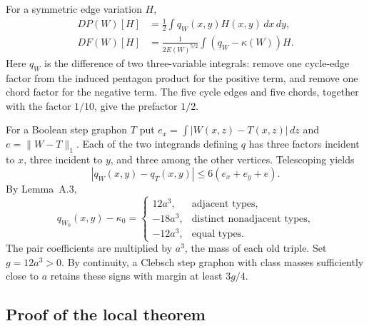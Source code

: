 \documentclass[11pt]{amsart}
\theoremstyle{definition}
\theoremstyle{remark}
\begin{document}
For a symmetric edge variation $H$,
\begin{equation}\tag{86}\label{eq:edge-variation}
 \begin{aligned}
 DP(W)[H]&=\frac12\int q_W(x,y)H(x,y)\,dx\,dy,\\
 DF(W)[H]&=\frac1{2E(W)^{5/2}}\int(q_W-\kappa(W))H.
 \end{aligned}
\end{equation}
Here $q_W$ is the difference of two three-variable integrals: remove
one cycle-edge factor from the induced pentagon product for the
positive term, and remove one chord factor for the negative term.
The five cycle edges and five chords, together with the factor $1/10$,
give the prefactor $1/2$.

For a Boolean step graphon $T$ put
$e_x=\int|W(x,z)-T(x,z)|\,dz$ and $e=\lVert W-T\rVert_1$. Each
of the two integrands defining $q$ has three factors incident to $x$,
three incident to $y$, and three among the other vertices.
Telescoping yields
\begin{equation}\tag{87}\label{eq:edge-variation-error}
 |q_W(x,y)-q_T(x,y)|\leq6(e_x+e_y+e).
\end{equation}
By Lemma~A.3,
\begin{equation}\tag{88}\label{eq:edge-sign-margin}
 q_{W_0}(x,y)-\kappa_0
 =\begin{cases}
   12a^3,&\text{adjacent types},\\
   -18a^3,&\text{distinct nonadjacent types},\\
   -12a^3,&\text{equal types}.
  \end{cases}
\end{equation}
The pair coefficients are multiplied by $a^3$, the mass of each old
triple. Set $g=12a^3>0$. By continuity, a Clebsch step graphon with
class masses sufficiently close to $a$ retains these signs with margin
at least $3g/4$.

\subsection{Proof of the local theorem}
\end{document}
